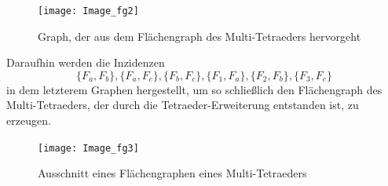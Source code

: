 \documentclass[12pt,titlepage,twoside,cleardoublepage]{article}
\theoremstyle{nummermitklammern}
\numberwithin{equation}{section}
\begin{document}
\begin{figure}[H]
\begin{center}
\texttt{[image: Image\_fg2]}
\end{center}
\caption{Graph, der aus dem Flächengraph des Multi-Tetraeders hervorgeht}
\end{figure}
Daraufhin werden die Inzidenzen 
\[
\{F_a,F_b\},\{F_a,F_c\},\{F_b,F_c\},\{F_1,F_a\},\{F_2,F_b\},\{F_3,F_c\}
\] 
in dem letzterem Graphen hergestellt, um so schließlich den Flächengraph des Multi-Tetraeders, der durch die Tetraeder-Erweiterung entstanden ist, zu erzeugen.
\begin{figure}[H]
\begin{center}
\texttt{[image: Image\_fg3]}
\end{center}
\caption{Ausschnitt eines Flächengraphen eines Multi-Tetraeders}
\end{figure}
\end{document}
